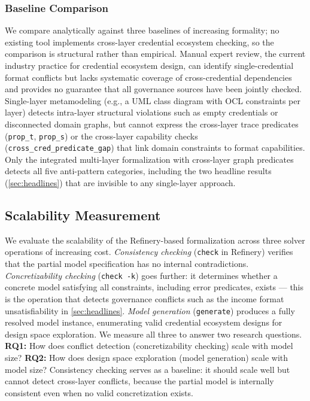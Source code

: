 \subsubsection{Baseline Comparison}\label{baseline-comparison}

\label{sec:baseline}

We compare analytically against three baselines of increasing formality; no existing tool implements cross-layer credential ecosystem checking, so the comparison is structural rather than empirical. Manual expert review, the current industry practice for credential ecosystem design, can identify single-credential format conflicts but lacks systematic coverage of cross-credential dependencies and provides no guarantee that all governance sources have been jointly checked. Single-layer metamodeling (e.g., a UML class diagram with OCL constraints per layer) detects intra-layer structural violations such as empty credentials or disconnected domain graphs, but cannot express the cross-layer trace predicates (\texttt{prop\_t}, \texttt{prop\_s}) or the cross-layer capability checks (\texttt{cross\_cred\_predicate\_gap}) that link domain constraints to format capabilities. Only the integrated multi-layer formalization with cross-layer graph predicates detects all five anti-pattern categories, including the two headline results (\autoref{sec:headlines}) that are invisible to any single-layer approach.

\subsection{Scalability Measurement}\label{scalability-measurement}

\label{sec:scalability}

We evaluate the scalability of the Refinery-based formalization across three solver operations of increasing cost. \emph{Consistency checking} (\texttt{check} in Refinery) verifies that the partial model specification has no internal contradictions. \emph{Concretizability checking} (\texttt{check\ -k}) goes further: it determines whether a concrete model satisfying all constraints, including error predicates, exists --- this is the operation that detects governance conflicts such as the income format unsatisfiability in \autoref{sec:headlines}. \emph{Model generation} (\texttt{generate}) produces a fully resolved model instance, enumerating valid credential ecosystem designs for design space exploration. We measure all three to answer two research questions. \textbf{RQ1:} How does conflict detection (concretizability checking) scale with model size? \textbf{RQ2:} How does design space exploration (model generation) scale with model size? Consistency checking serves as a baseline: it should scale well but cannot detect cross-layer conflicts, because the partial model is internally consistent even when no valid concretization exists.

